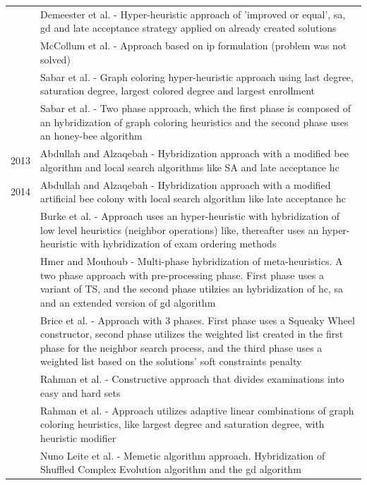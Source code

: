 \begin{table}
\begin{tabular}{@{\,}r <{\hskip 2pt} !{\foo} >{\raggedright\arraybackslash}p{15cm}}
		& Demeester et al. - Hyper-heuristic approach of 'improved or equal', \gls{sa}, \gls{gd} and late acceptance strategy applied on already created solutions\\
		& McCollum et al. - Approach based on \gls{ip} formulation (problem was not solved)\\
		& Sabar et al. - Graph coloring hyper-heuristic approach using last degree, saturation degree, largest colored degree and largest enrollment\\
		& Sabar et al. - Two phase approach, which the first phase is composed of an hybridization of graph coloring heuristics and the second phase uses an honey-bee algorithm\\
2013	& Abdullah and Alzaqebah - Hybridization approach with a modified bee algorithm and local search algorithms like SA and late acceptance \gls{hc}\\
2014	& Abdullah and Alzaqebah - Hybridization approach with a modified artificial bee colony with local search algorithm like late acceptance \gls{hc}\\
		& Burke et al. - Approach uses an hyper-heuristic with hybridization of low level heuristics (neighbor operations) like, thereafter uses an hyper-heuristic with hybridization of exam ordering methods\\
		& Hmer and Mouhoub - Multi-phase hybridization of meta-heuristics. A two phase approach with pre-processing phase. First phase uses a variant of TS, and the second phase utilzies an hybridization of \gls{hc}, \gls{sa} and an extended version of \gls{gd} algorithm\\
		& Brice et al. - Approach with 3 phases. First phase uses a Squeaky Wheel constructor, second phase utilizes the weighted list created in the first phase for the neighbor search process, and the third phase uses a weighted list based on the solutions' soft constraints penalty\\
		& Rahman et al. - Constructive approach that divides examinations into easy and hard sets\\
		& Rahman et al. - Approach utilizes adaptive linear combinations of graph coloring heuristics, like largest degree and saturation degree, with heuristic modifier\\
		& Nuno Leite et al. - Memetic algorithm approach. Hybridization of Shuffled Complex Evolution algorithm and the \gls{gd} algorithm\\
		
\end{tabular}
\end{table}
